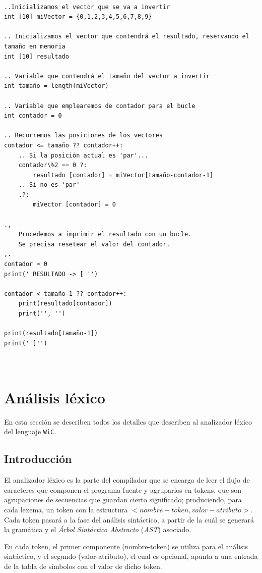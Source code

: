 \documentclass[11pt, english]{article}
\begin{document}
\begin{lstlisting}[caption=Cambiar el orden de los elementos en un Array con condición.]

..Inicializamos el vector que se va a invertir
int [10] miVector = {0,1,2,3,4,5,6,7,8,9}

.. Inicializamos el vector que contendrá el resultado, reservando el tamaño en memoria
int [10] resultado

.. Variable que contendrá el tamaño del vector a invertir
int tamaño = length(miVector)

.. Variable que emplearemos de contador para el bucle
int contador = 0

.. Recorremos las posiciones de los vectores
contador <= tamaño ?? contador++:
	.. Si la posición actual es 'par'...
	contador\%2 == 0 ?:
		resultado [contador] = miVector[tamaño-contador-1]
	.. Si no es 'par'
	.?:
		miVector [contador] = 0

., 
	Procedemos a imprimir el resultado con un bucle.
	Se precisa resetear el valor del contador.
,.
contador = 0
print(''RESULTADO -> [ '')

contador < tamaño-1 ?? contador++:
	print(resultado[contador])
	print('', '')
	
print(resultado[tamaño-1])
print('']'')

		
\end{lstlisting}



\section{Análisis léxico}\label{Definicion-lenguaje}
En esta sección se describen todos los detalles que describen al analizador léxico del lenguaje \texttt{WiC}.

\subsection{Introducción}\label{Introdución}
El analizador léxico es la parte del compilador que se encarga de leer el flujo de caracteres que componen el programa fuente y agruparlos en tokens, que son agrupaciones de secuencias que guardan cierto significado; produciendo, para cada lexema, un token con la estructura $<nombre-token, valor-atributo>$. Cada token pasará a la fase del análisis sintáctico, a partir de la cuál se generará la gramática y el \textit{Árbol Sintáctico Abstracto} (\textit{AST}) asociado.


En cada token, el primer componente (nombre-token) se utiliza para el análisis sintáctico, y el segundo (valor-atributo), el cual es opcional, apunta a una entrada de la tabla de símbolos con el valor de dicho token.
\end{document}
